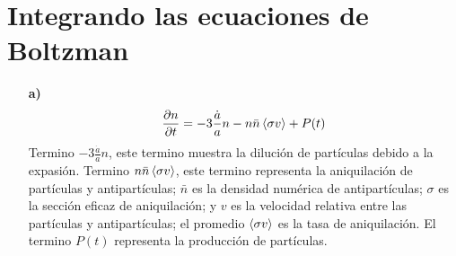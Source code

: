 \documentclass{article}
\begin{document}
\section{Integrando las ecuaciones de Boltzman }
\begin{itemize}
  \item[\textbf{a)}] 
    \begin{gather*}
      \frac{\partial n  }{\partial t } = - 3 \frac{\dot a }{a } n - n \bar n \expval{\sigma v } + P(t)
    \end{gather*}
    Termino $ -3 \frac{\dot a }{a }n  $, este termino muestra la dilución de partículas debido a la expasión. Termino $ n\bar n \expval{\sigma v } $, este termino representa la aniquilación de partículas y antipartículas; $ \bar n  $ es la densidad numérica de antipartículas; $ \sigma $ es la sección eficaz de aniquilación; y $ v  $ es la velocidad relativa entre las partículas y antipartículas; el promedio $ \expval{\sigma v }  $ es la tasa de aniquilación. El termino $ P(t)  $ representa la producción de partículas.
\end{itemize}
\end{document}

